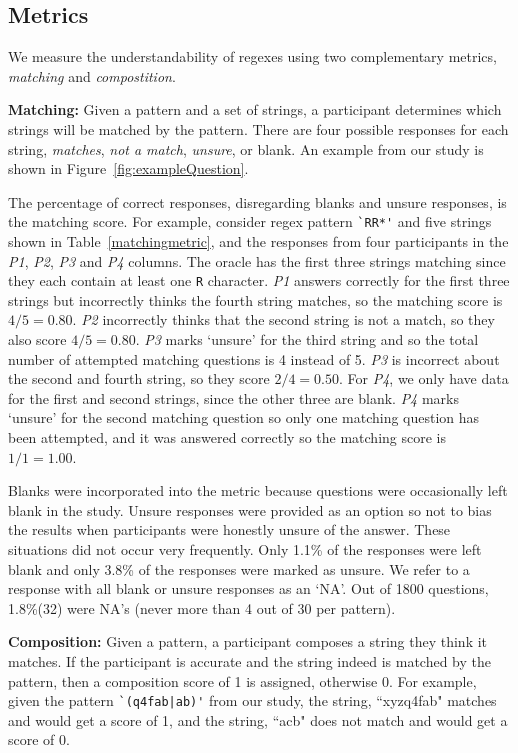 \subsection{Metrics}
We measure the understandability of regexes using two complementary metrics, \emph{matching} and \emph{compostition}.

\textbf{Matching:}
Given a pattern and a set of strings, a participant determines which strings will be matched by the pattern. There are four possible responses for each string, \emph{matches}, \emph{not a match}, \emph{unsure}, or blank. An example from our study is shown in Figure~\ref{fig:exampleQuestion}.

The percentage of correct responses, disregarding blanks and unsure responses, is the matching score.
For example, consider regex pattern \verb!`RR*'! and five strings shown in Table~\ref{matchingmetric}, and the responses from four participants in the \emph{P1}, \emph{P2}, \emph{P3} and \emph{P4} columns.
The oracle has the first three strings matching since they each contain at least one \verb!R! character. \emph{P1} answers correctly for the first three strings but incorrectly thinks the fourth string matches, so the matching score is $4/5 = 0.80$. \emph{P2} incorrectly thinks that the second string is not a match, so they also score $4/5 = 0.80$.  \emph{P3} marks `unsure' for the third string and so the total number of attempted matching questions is 4 instead of 5. \emph{P3} is incorrect about the second and fourth string, so they score $2/4 = 0.50$.  For \emph{P4}, we only have data for the first and second strings, since the other three are blank.  \emph{P4} marks `unsure' for the second matching question so only one matching question has been attempted, and it was answered correctly so the matching score is $1/1 = 1.00$.

Blanks were incorporated into the metric because questions were occasionally left blank in the study. Unsure responses were provided as an option so not to bias the  results when participants were honestly unsure of the answer. These situations did not occur very frequently. Only 1.1\% of the responses were left blank and only 3.8\% of the responses were marked as unsure.  We refer to a response with all blank or unsure responses as an `NA'. Out of 1800 questions, 1.8\%(32) were NA's (never more than 4 out of 30 per pattern).

\textbf{Composition:}
Given a pattern, a participant composes a string they think it matches. If the participant is accurate and the string indeed is matched by the pattern, then a composition score of 1 is assigned, otherwise 0.  For example, given the pattern \verb!`(q4fab|ab)'! from our study, the string, ``xyzq4fab" matches  and would get a score of 1, and the string, ``acb" does not match and would get a score of 0.

